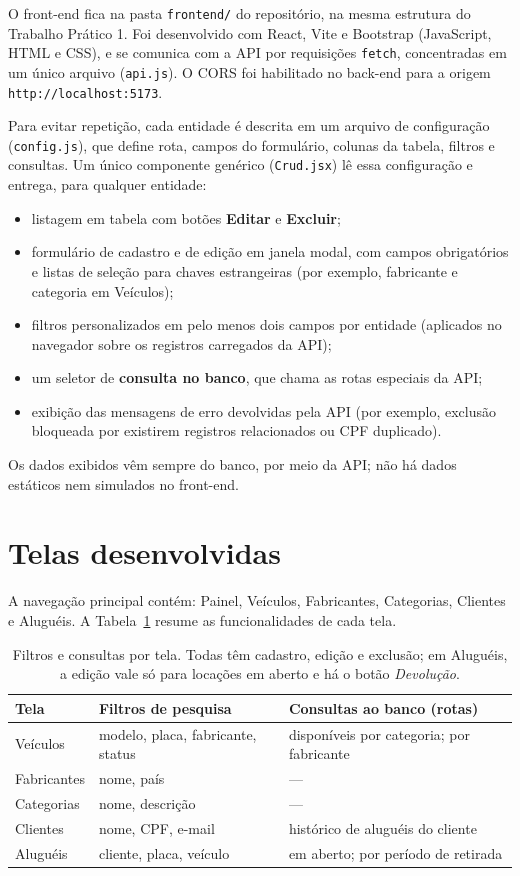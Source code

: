 \documentclass[12pt]{article}
\begin{document}
O front-end fica na pasta \texttt{frontend/} do repositório, na mesma estrutura do Trabalho Prático 1. Foi desenvolvido com React, Vite e Bootstrap (JavaScript, HTML e CSS), e se comunica com a API por requisições \texttt{fetch}, concentradas em um único arquivo (\texttt{api.js}). O CORS foi habilitado no back-end para a origem \texttt{http://localhost:5173}.

Para evitar repetição, cada entidade é descrita em um arquivo de configuração (\texttt{config.js}), que define rota, campos do formulário, colunas da tabela, filtros e consultas. Um único componente genérico (\texttt{Crud.jsx}) lê essa configuração e entrega, para qualquer entidade:
\begin{itemize}
  \item listagem em tabela com botões \textbf{Editar} e \textbf{Excluir};
  \item formulário de cadastro e de edição em janela modal, com campos obrigatórios e listas de seleção para chaves estrangeiras (por exemplo, fabricante e categoria em Veículos);
  \item filtros personalizados em pelo menos dois campos por entidade (aplicados no navegador sobre os registros carregados da API);
  \item um seletor de \textbf{consulta no banco}, que chama as rotas especiais da API;
  \item exibição das mensagens de erro devolvidas pela API (por exemplo, exclusão bloqueada por existirem registros relacionados ou CPF duplicado).
\end{itemize}

Os dados exibidos vêm sempre do banco, por meio da API; não há dados estáticos nem simulados no front-end.

\section{Telas desenvolvidas}

A navegação principal contém: Painel, Veículos, Fabricantes, Categorias, Clientes e Aluguéis. A Tabela~\ref{tab:telas} resume as funcionalidades de cada tela.

\begin{table}[ht]
\centering
\small
\begin{tabular}{@{}p{2.2cm}p{4.3cm}p{6.5cm}@{}}
\toprule
\textbf{Tela} & \textbf{Filtros de pesquisa} & \textbf{Consultas ao banco (rotas)}\\
\midrule
Veículos & modelo, placa, fabricante, status & disponíveis por categoria; por fabricante\\
Fabricantes & nome, país & ---\\
Categorias & nome, descrição & ---\\
Clientes & nome, CPF, e-mail & histórico de aluguéis do cliente\\
Aluguéis & cliente, placa, veículo & em aberto; por período de retirada\\
\bottomrule
\end{tabular}
\caption{Filtros e consultas por tela. Todas têm cadastro, edição e exclusão; em Aluguéis, a edição vale só para locações em aberto e há o botão \textit{Devolução}.}
\label{tab:telas}
\end{table}
\end{document}
